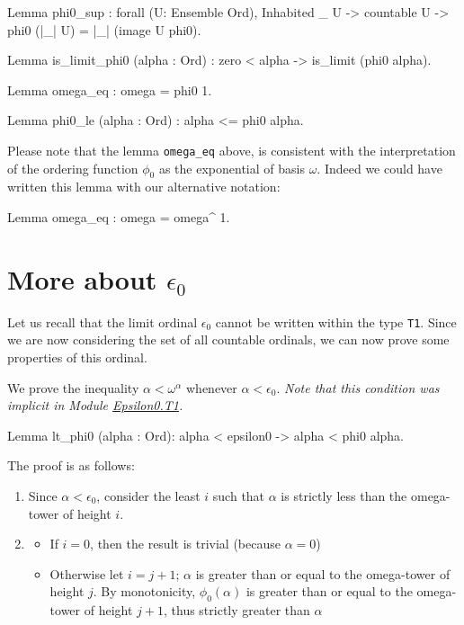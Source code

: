 {\begin{Coqsrc}
Lemma phi0_sup : forall (U: Ensemble Ord),
   Inhabited _ U ->   countable U ->  phi0 (|_| U) = |_| (image U phi0).

Lemma is_limit_phi0 (alpha : Ord) :
  zero < alpha ->  is_limit (phi0 alpha).

Lemma omega_eq : omega = phi0 1. 

Lemma phi0_le (alpha : Ord) : alpha <= phi0 alpha.
\end{Coqsrc}

Please note that the lemma \texttt{omega\_eq} above, is consistent with the interpretation of the ordering function $\phi_0$ as the exponential of basis $\omega$. Indeed we could have written this lemma with our alternative notation:

\begin{Coqsrc}
 Lemma omega_eq : omega = omega^ 1.
\end{Coqsrc}

\section{More about \texorpdfstring{$\epsilon_0$}{\texttt{epsilon0}}}

Let us recall that the limit ordinal  $\epsilon_0$ cannot be written within the type \texttt{T1}. Since we are now considering the set of all countable ordinals, we can now prove some properties of this ordinal.


We prove the inequality  $\alpha<\omega^\alpha$ whenever $\alpha < \epsilon_0$.
\emph{Note that this condition was implicit in Module
\href{../theories/html/hydras.Epsilon0.T1.html\#lt_phi0}{Epsilon0.T1}.}

\begin{Coqsrc}
Lemma lt_phi0 (alpha : Ord):
  alpha < epsilon0 -> alpha < phi0 alpha.
\end{Coqsrc}

The proof is as follows:
\begin{enumerate}
\item Since $\alpha<\epsilon_0$, consider the least $i$ such that $\alpha$ is strictly less than the omega-tower of height $i$.
\item
  \begin{itemize}
  \item If $i=0$, then the result is trivial (because $\alpha=0$)
 \item  Otherwise let $i=j+1$; 
          $\alpha$ is greater than or equal to the omega-tower of height $j$.
         By monotonicity,  $\phi_0(\alpha)$ is greater than or equal to 
        the omega-tower of height $j+1$, thus strictly greater than $\alpha$
  \end{itemize}
 \end{enumerate}

}
